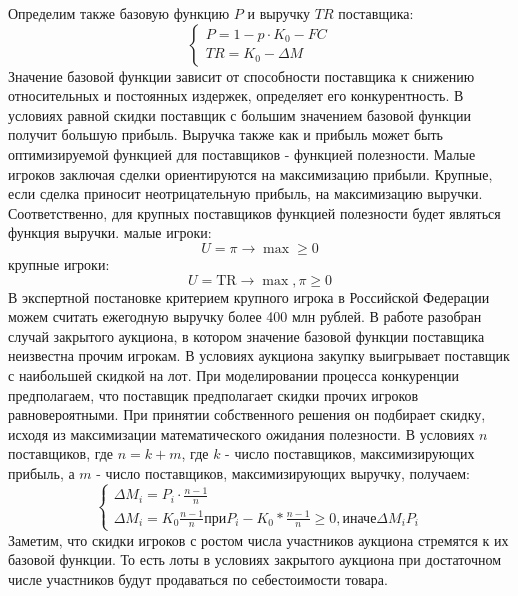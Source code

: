 Определим также базовую функцию $P$ и выручку $TR$ поставщика: 
\begin{equation}
    \begin{cases}
        P=1-p \cdot K_0 -FC  \\
        TR=K_0- \Delta M 
    \end{cases}
\end{equation}
Значение базовой функции зависит от способности поставщика к снижению относительных и постоянных издержек, определяет его конкурентность. В условиях равной скидки поставщик с большим значением базовой функции получит большую прибыль.
Выручка также как и прибыль может быть оптимизируемой функцией для поставщиков - функцией полезности. Малые игроков заключая сделки ориентируются на максимизацию прибыли. Крупные, если сделка приносит неотрицательную прибыль, на максимизацию выручки. Соответственно, для крупных поставщиков функцией полезности будет являться функция выручки. 
малые игроки:
\begin{equation}
    U= \pi \rightarrow \max \ge 0
\end{equation}
крупные игроки: 
\begin{equation}
    U = \text{TR} \rightarrow \max , \pi \ge 0
\end{equation}
В экспертной постановке критерием крупного игрока в Российской Федерации можем считать ежегодную выручку более 400 млн рублей.
В работе \cite{Bogdanov2023} разобран случай закрытого аукциона, в котором значение базовой функции поставщика неизвестна прочим игрокам. В условиях аукциона закупку выигрывает поставщик с наибольшей скидкой на лот. 
При моделировании процесса конкуренции предполагаем, что поставщик предполагает скидки прочих игроков равновероятными. При принятии собственного решения он подбирает скидку, исходя из максимизации математического ожидания полезности. В условиях $n$ поставщиков, где $n=k+m$, где $k$ - число поставщиков, максимизирующих прибыль, а $m$ - число поставщиков, максимизирующих выручку, получаем:
\begin{equation}
    \begin{cases}
        \Delta M_i = P_i \cdot \frac{n-1}{n} \\
        \Delta M_i = K_0 \frac{n-1}{n} \text{при}  P_i- K_0*\frac{n-1}{n} \ge 0, \text{иначе} \Delta M_i  P_i 
    \end{cases}
\end{equation}
Заметим, что скидки игроков с ростом числа участников аукциона стремятся к их базовой функции. То есть лоты в условиях закрытого аукциона при достаточном числе участников будут продаваться по себестоимости товара. 
